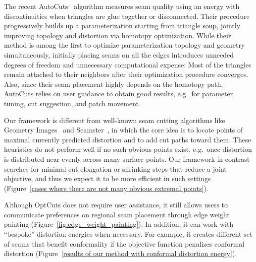 The recent AutoCuts~\cite{Poranne2017Autocuts} algorithm measures seam quality using an energy with discontinuities when triangles are glue together or disconnected.  Their procedure progressively builds up a parameterization starting from triangle soup, jointly improving topology and distortion via homotopy optimization. 
%
While their method is among the first to optimize parameterization topology and geometry simultaneously, 
initially placing seams on all the edges introduces unneeded degrees of freedom and unnecessary computational expense:  Most of the triangles remain attached to their neighbors after their optimization procedure converges. Also, since their seam placement highly depends on the homotopy path, AutoCuts relies on user guidance to obtain good results, e.g.\ for parameter tuning, cut suggestion, and patch movement. %

Our framework is different from well-known seam cutting algorithms like Geometry Images~\cite{Gu2002Geometry} and Seamster~\cite{Sheffer2002Seamster}, in which the core idea is to locate points of maximal currently predicted distortion and to add cut paths toward them. These heuristics do not perform well if no such obvious points exist, e.g.\ once distortion is distributed near-evenly across many surface points. Our framework in contrast searches for minimal cut elongation or shrinking steps that reduce a joint objective, and thus we expect it to be more efficient in such settings (Figure~\ref{cases where there are not many obvious extremal points}).

Although OptCuts does not require user assistance, it still allows users to communicate preferences on regional seam placement through edge weight painting (Figure~\ref{fig:edge_weight_painting}).
In addition, it can work with ``bespoke'' distortion energies when necessary. %
For example, it creates different set of seams that benefit conformality if the objective function penalizes conformal distortion (Figure~\ref{results of our method with conformal distortion energy}).